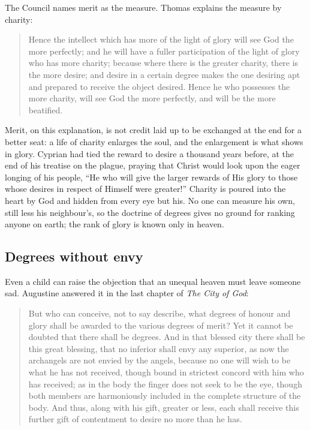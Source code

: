 The Council names merit as the measure. Thomas explains the measure by charity:

\begin{quote}
Hence the intellect which has more of the light of glory will see God the more perfectly; and he will have a fuller participation of the light of glory who has more charity; because where there is the greater charity, there is the more desire; and desire in a certain degree makes the one desiring apt and prepared to receive the object desired. Hence he who possesses the more charity, will see God the more perfectly, and will be the more beatified.
\end{quote}

Merit, on this explanation, is not credit laid up to be exchanged at the end for a better seat: a life of charity enlarges the soul, and the enlargement is what shows in glory. Cyprian had tied the reward to desire a thousand years before, at the end of his treatise on the plague, praying that Christ would look upon the eager longing of his people, ``He who will give the larger rewards of His glory to those whose desires in respect of Himself were greater!'' Charity is poured into the heart by God and hidden from every eye but his. No one can measure his own, still less his neighbour's, so the doctrine of degrees gives no ground for ranking anyone on earth; the rank of glory is known only in heaven.

\subsection{Degrees without envy}

Even a child can raise the objection that an unequal heaven must leave someone sad. Augustine answered it in the last chapter of \emph{The City of God}:

\begin{quote}
But who can conceive, not to say describe, what degrees of honour and glory shall be awarded to the various degrees of merit? Yet it cannot be doubted that there shall be degrees. And in that blessed city there shall be this great blessing, that no inferior shall envy any superior, as now the archangels are not envied by the angels, because no one will wish to be what he has not received, though bound in strictest concord with him who has received; as in the body the finger does not seek to be the eye, though both members are harmoniously included in the complete structure of the body. And thus, along with his gift, greater or less, each shall receive this further gift of contentment to desire no more than he has.
\end{quote}

